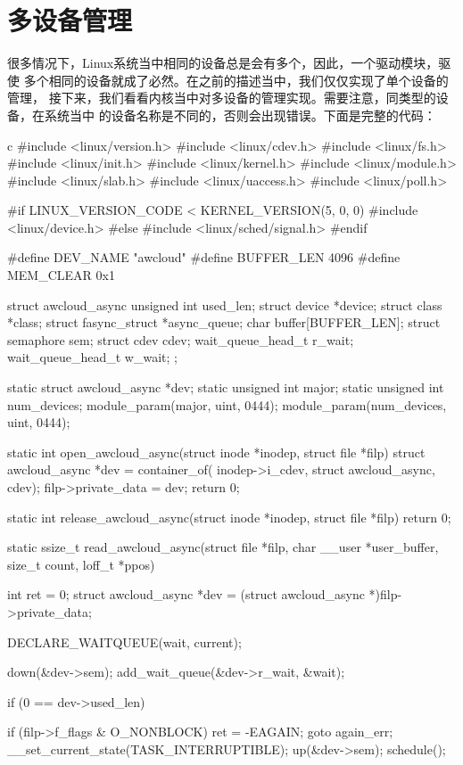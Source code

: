 \section{多设备管理}
很多情况下，Linux系统当中相同的设备总是会有多个，因此，一个驱动模块，驱使
多个相同的设备就成了必然。在之前的描述当中，我们仅仅实现了单个设备的管理，
接下来，我们看看内核当中对多设备的管理实现。需要注意，同类型的设备，在系统当中
的设备名称是不同的，否则会出现错误。下面是完整的代码：
\begin{code-block}{c}
#include <linux/version.h>
#include <linux/cdev.h>
#include <linux/fs.h>
#include <linux/init.h>
#include <linux/kernel.h>
#include <linux/module.h>
#include <linux/slab.h>
#include <linux/uaccess.h>
#include <linux/poll.h>

#if LINUX_VERSION_CODE < KERNEL_VERSION(5, 0, 0)
#include <linux/device.h>
#else
#include <linux/sched/signal.h>
#endif

#define DEV_NAME "awcloud"
#define BUFFER_LEN 4096
#define MEM_CLEAR 0x1

struct awcloud_async {
        unsigned int         used_len;
        struct device        *device;
        struct class         *class;
        struct fasync_struct *async_queue;
        char                 buffer[BUFFER_LEN];
        struct semaphore     sem;
        struct cdev          cdev;
        wait_queue_head_t    r_wait;
        wait_queue_head_t    w_wait;
};

static struct awcloud_async *dev;
static unsigned int major;
static unsigned int num_devices;
module_param(major, uint, 0444);
module_param(num_devices, uint, 0444);

static int open_awcloud_async(struct inode *inodep, struct file *filp)
{
        struct awcloud_async *dev = container_of(
                inodep->i_cdev, struct awcloud_async, cdev);
        filp->private_data = dev;
        return 0;
}

static int release_awcloud_async(struct inode *inodep, struct file *filp)
{
        return 0;
}

static ssize_t read_awcloud_async(struct file *filp,
        char __user *user_buffer, size_t count, loff_t *ppos)
{
        int ret = 0;
        struct awcloud_async *dev = (struct awcloud_async *)filp->private_data;

        DECLARE_WAITQUEUE(wait, current);

        down(&dev->sem);
        add_wait_queue(&dev->r_wait, &wait);

        if (0 == dev->used_len) {
                if (filp->f_flags & O_NONBLOCK) {
                        ret = -EAGAIN;
                        goto again_err;
                }
                __set_current_state(TASK_INTERRUPTIBLE);
                up(&dev->sem);
                schedule();

}}
\end{code-block}
